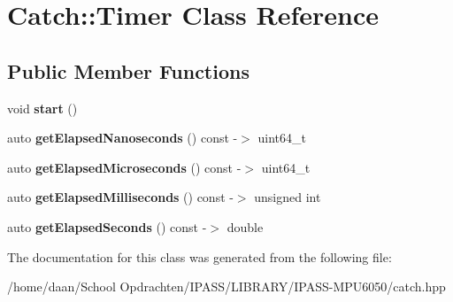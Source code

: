 \hypertarget{classCatch_1_1Timer}{}\section{Catch\+:\+:Timer Class Reference}
\label{classCatch_1_1Timer}
\subsection*{Public Member Functions}
\begin{DoxyCompactItemize}
\item 
\mbox{\label{classCatch_1_1Timer_a0a56e879e43f36c102bf9ea8b5fc8b72}} 
void {\bfseries start} ()
\item 
\mbox{\label{classCatch_1_1Timer_a57be5d17ca868a2d6fb1eea84de665cf}} 
auto {\bfseries get\+Elapsed\+Nanoseconds} () const -\/$>$ uint64\+\_\+t
\item 
\mbox{\label{classCatch_1_1Timer_a545de17a61a6fee1dbe3de5b0723e5fa}} 
auto {\bfseries get\+Elapsed\+Microseconds} () const -\/$>$ uint64\+\_\+t
\item 
\mbox{\label{classCatch_1_1Timer_a30aaf458dbb59dd8ac8971c9c62e0eac}} 
auto {\bfseries get\+Elapsed\+Milliseconds} () const -\/$>$ unsigned int
\item 
\mbox{\label{classCatch_1_1Timer_a065e37e3c9eb16bd4dcf41971d8deedc}} 
auto {\bfseries get\+Elapsed\+Seconds} () const -\/$>$ double
\end{DoxyCompactItemize}


The documentation for this class was generated from the following file\+:\begin{DoxyCompactItemize}
\item 
/home/daan/\+School Opdrachten/\+I\+P\+A\+S\+S/\+L\+I\+B\+R\+A\+R\+Y/\+I\+P\+A\+S\+S-\/\+M\+P\+U6050/catch.\+hpp\end{DoxyCompactItemize}
